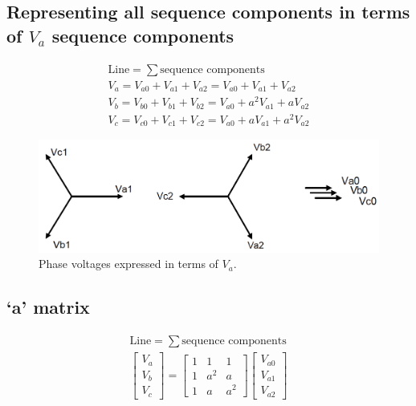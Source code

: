 \documentclass[class=report, crop=false, 12pt,a4paper]{standalone}
\begin{document}
\subsection{Representing all sequence components in terms of $V_{a}$ sequence components}
\begin{gather}
	\textrm{Line} = \sum \textrm{sequence components}\\
	V_a = V_{a0} + V_{a1} + V_{a2} = V_{a0} + V_{a1} + V_{a2}\\
	V_b = V_{b0} + V_{b1} + V_{b2} = V_{a0} + a^2 V_{a1} + aV_{a2}\\
	V_c = V_{c0} + V_{c1} + V_{c2} = V_{a0} + aV_{a1} + a^2V_{a2}
\end{gather}
\begin{figure}[H]
	\centering
	\includegraphics[width = \textwidth]{../img/figure30.png}
	\caption{Phase voltages expressed in terms of $V_{a}$.}
\end{figure}
\subsection{`a' matrix}
\begin{gather}
	\textrm{Line} = \sum \textrm{sequence components}\\
	\begin{bmatrix}
		V_a\\
		V_b\\
		V_c
	\end{bmatrix} = \begin{bmatrix}
		1 & 1 & 1\\
		1 & a^2 & a\\
		1 & a & a^2
	\end{bmatrix}\begin{bmatrix}
		V_{a0}\\
		V_{a1}\\
		V_{a2}
	\end{bmatrix}
\end{gather}
\end{document}
